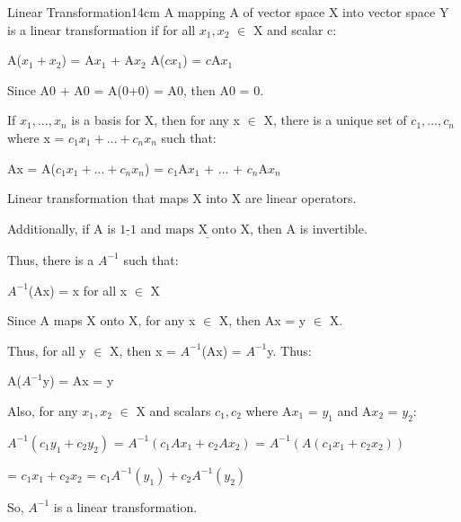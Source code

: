     \begin{definition}{Linear Transformation}{14cm}
        A mapping A of vector space X into vector space Y is
        a linear transformation if for all $x_1,x_2$ $\in$ X and scalar c:

        \hspace{0.5cm}
        A($x_1+x_2$) = A$x_1$ + A$x_2$
        \hspace{1cm}
        A($cx_1$) = $c$A$x_1$

        Since A0 + A0 = A(0+0) = A0, then A0 = 0.

        \vspace{0.2cm}

        If $x_1,...,x_n$ is a basis for X, then for any x $\in$ X, there
        is a unique set of $c_1,...,c_n$ where x = $c_1x_1 + ... + c_nx_n$
        such that:

        \hspace{0.5cm}
        Ax = A($c_1x_1 + ... + c_nx_n$)
        = $c_1$A$x_1$ + ... + $c_n$A$x_n$

        \vspace{0.2cm}

        Linear transformation that maps X into X are
        {\color{lblue} linear operators}.

        Additionally, if A is $\underline{\text{1-1}}$ and
        $\underline{\text{maps X onto X}}$,
        then A is {\color{lblue} invertible}.
        
        Thus, there is a $A^{-1}$ such that:

        \hspace{0.5cm}
        $A^{-1}$(Ax) = x
        \hspace{1cm}
        for all x $\in$ X

        Since A maps X onto X, for any x $\in$ X, then Ax = y $\in$ X.

        Thus, for all y $\in$ X, then x = $A^{-1}$(Ax) = $A^{-1}$y. Thus:

        \hspace{0.5cm}
        A($A^{-1}$y) = Ax = y

        Also, for any $x_1,x_2$ $\in$ X and scalars $c_1,c_2$
        where A$x_1$ = $y_1$ and A$x_2$ = $y_2$:

        \hspace{0.5cm}
        $A^{-1}(c_1y_1 + c_2y_2)$
        = $A^{-1}(c_1Ax_1 + c_2Ax_2)$
        = $A^{-1}(A(c_1x_1 + c_2x_2))$

        \hspace{3.6cm}
        = $c_1x_1 + c_2x_2$
        = $c_1A^{-1}(y_1) + c_2A^{-1}(y_2)$

        So, $A^{-1}$ is a linear transformation.
    \end{definition}

